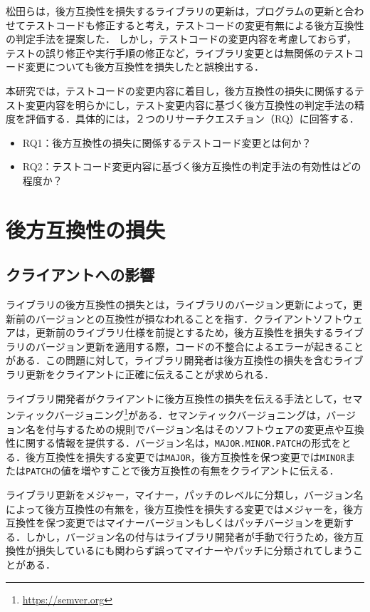 \documentclass[11pt,dvipdfmx]{jreport}
\begin{document}
松田らは，後方互換性を損失するライブラリの更新は，プログラムの更新と合わせてテストコードも修正すると考え，テストコードの変更有無による後方互換性の判定手法を提案した．
\cite{matsuda}
しかし，テストコードの変更内容を考慮しておらず，テストの誤り修正や実行手順の修正など，ライブラリ変更とは無関係のテストコード変更についても後方互換性を損失したと誤検出する．

本研究では，テストコードの変更内容に着目し，後方互換性の損失に関係するテスト変更内容を明らかにし，テスト変更内容に基づく後方互換性の判定手法の精度を評価する．具体的には，２つのリサーチクエスチョン（RQ）に回答する．

\begin{itemize}
  \item RQ1：後方互換性の損失に関係するテストコード変更とは何か？
  \item RQ2：テストコード変更内容に基づく後方互換性の判定手法の有効性はどの程度か？
\end{itemize}

\chapter{後方互換性の損失}

\section{クライアントへの影響}
ライブラリの後方互換性の損失とは，ライブラリのバージョン更新によって，更新前のバージョンとの互換性が損なわれることを指す．クライアントソフトウェアは，更新前のライブラリ仕様を前提とするため，後方互換性を損失するライブラリのバージョン更新を適用する際，コードの不整合によるエラーが起きることがある．この問題に対して，ライブラリ開発者は後方互換性の損失を含むライブラリ更新をクライアントに正確に伝えることが求められる．

ライブラリ開発者がクライアントに後方互換性の損失を伝える手法として，セマンティックバージョニング\footnote{\url{https://semver.org}}がある．セマンティックバージョニングは，バージョン名を付与するための規則でバージョン名はそのソフトウェアの変更点や互換性に関する情報を提供する．バージョン名は，{\verb|MAJOR.MINOR.PATCH|}の形式をとる．後方互換性を損失する変更では{\verb|MAJOR|}，後方互換性を保つ変更では{\verb|MINOR|}または{\verb|PATCH|}の値を増やすことで後方互換性の有無をクライアントに伝える．

ライブラリ更新をメジャー，マイナー，パッチのレベルに分類し，バージョン名によって後方互換性の有無を，後方互換性を損失する変更ではメジャーを，後方互換性を保つ変更ではマイナーバージョンもしくはパッチバージョンを更新する．しかし，バージョン名の付与はライブラリ開発者が手動で行うため，後方互換性が損失しているにも関わらず誤ってマイナーやパッチに分類されてしまうことがある．
\end{document}
